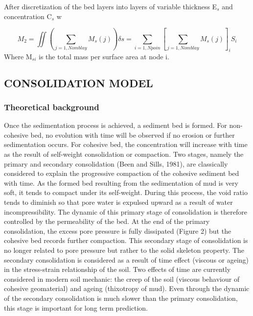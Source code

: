 After discretization of the bed layers into layers of variable thickness E$%
_{s}$ and concentration C$_{s}$ w

\begin{equation*}
M_{2} =\iint \left( \sum\limits_{j=1,Nomblay}M_{s} (j) \right) \delta
s=\sum\limits_{i=1,Npoin}\left[ \sum\limits_{j=1,Nomblay}M_{s} (j) \right]
_{i} S_{i} 
\end{equation*}
Where M$_{si}$ is the total mass per surface area at node i.

\newpage

\subsection{CONSOLIDATION MODEL}

\subsubsection{Theoretical background}

Once the sedimentation process is achieved, a sediment bed is formed. For
non-cohesive bed, no evolution with time will be observed if no erosion or
further sedimentation occurs. For cohesive bed, the concentration will
increase with time as the result of self-weight consolidation or compaction.
Two stages, namely the primary and secondary consolidation (Been and Sills,
1981), are classically considered to explain the progressive compaction of
the cohesive sediment bed with time. As the formed bed resulting from the
sedimentation of mud is very soft, it tends to compact under its
self-weight. During this process, the void ratio tends to diminish so that
pore water is expulsed upward as a result of water incompressibility. The
dynamic of this primary stage of consolidation is therefore controlled by
the permeability of the bed. At the end of the primary consolidation, the
excess pore pressure is fully dissipated (Figure 2) but the cohesive bed
records further compaction. This secondary stage of consolidation is no
longer related to pore pressure but rather to the solid skeleton property.
The secondary consolidation is considered as a result of time effect
(viscous or ageing) in the stress-strain relationship of the soil. Two
effects of time are currently considered in modern soil mechanic: the creep
of the soil (viscous behaviour of cohesive geomaterial) and ageing
(thixotropy of mud). Even through the dynamic of the secondary consolidation
is much slower than the primary consolidation, this stage is important for
long term prediction.


